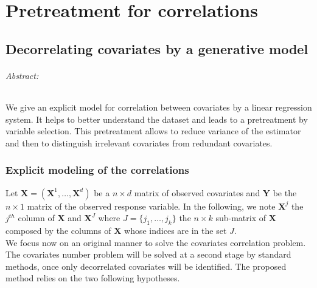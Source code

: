 \documentclass[12pt,a4paper]{report}
\begin{document}
			
\part{Pretreatment for correlations}
\chapter{Decorrelating covariates by a generative model}
\paragraph{Abstract:} 
We give an explicit model for correlation between covariates by a linear regression system. It helps to better understand the dataset and leads to a pretreatment by variable selection. This pretreatment allows to reduce variance of the estimator and then to distinguish irrelevant covariates from redundant covariates.
\\

\section{Explicit modeling of the correlations}
	Let $\boldsymbol{X}=(\boldsymbol{X}^1,\dots,\boldsymbol{X}^d)$ be a $n \times d$ matrix of observed covariates and $\boldsymbol{Y}$ be the $n \times 1$ matrix of the observed response variable. In the following, we note $\boldsymbol{X}^j$ the $j^{th}$ column of $\boldsymbol{X}$ and $\boldsymbol{X}^{J}$ where $J=\{j_1,\dots,j_k\}$ the $n\times k$ sub-matrix of $\boldsymbol{X}$ composed by the columns of $\boldsymbol{X}$ whose indices are in the set $J$. 
\\




We focus now on an original manner to solve the covariates correlation problem. The covariates number problem will be solved at a second stage by standard methods, once only decorrelated covariates will be identified. The proposed method relies on the two following hypotheses.
\end{document}
